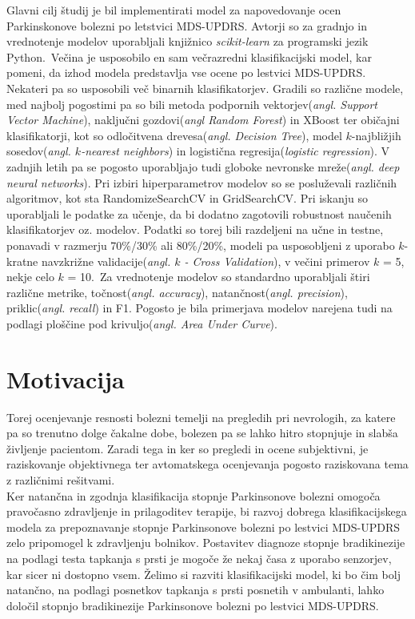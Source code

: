 \documentclass[a4paper,12pt]{article}  %
\begin{document}
Glavni cilj študij je bil implementirati model za napovedovanje ocen Parkinskonove bolezni po letstvici 
MDS-UPDRS. Avtorji so za gradnjo in vrednotenje modelov uporabljali knjižnico \textit{scikit-learn} za programski 
jezik Python.\
Večina je usposobilo en sam večrazredni klasifikacijski model, kar pomeni, da izhod modela predstavlja vse 
ocene po lestvici MDS-UPDRS. Nekateri pa so usposobili več binarnih klasifikatorjev. Gradili so različne 
modele, med najbolj pogostimi pa so bili metoda podpornih vektorjev(\textit{angl. Support Vector Machine}), naključni 
gozdovi(\textit{angl Random Forest}) in XBoost ter običajni klasifikatorji, kot so odločitvena drevesa(\textit{angl. Decision 
Tree}), model $k$-najbližjih sosedov(\textit{angl. $k$-nearest neighbors}) in logistična regresija(\textit{logistic 
regression}). V zadnjih letih pa se pogosto uporabljajo tudi globoke nevronske mreže(\textit{angl. deep neural 
networks}). Pri izbiri hiperparametrov modelov so se posluževali različnih algoritmov, kot sta 
RandomizeSearchCV in GridSearchCV. Pri iskanju so uporabljali le podatke za učenje, da bi dodatno 
zagotovili robustnost naučenih klasifikatorjev oz. modelov. Podatki so torej bili razdeljeni na učne in 
testne, ponavadi v razmerju 70\%/30\% ali 80\%/20\%, modeli pa usposobljeni z uporabo $k$-kratne navzkrižne 
validacije(\textit{angl. $k$ - Cross Validation}), v večini primerov $k$ = 5, nekje celo $k$ = 10.\
Za vrednotenje modelov so standardno uporabljali štiri različne metrike, točnost(\textit{angl. accuracy}), 
natančnost(\textit{angl. precision}), priklic(\textit{angl. recall}) in F1. Pogosto je bila primerjava modelov narejena 
tudi na podlagi ploščine pod krivuljo(\textit{angl. Area Under Curve}). 

\section{Motivacija}

Torej ocenjevanje resnosti bolezni temelji na pregledih pri nevrologih, za katere pa so trenutno dolge 
čakalne dobe, bolezen pa se lahko hitro stopnjuje in slabša življenje pacientom. Zaradi tega in ker so 
pregledi in ocene subjektivni, je raziskovanje objektivnega ter avtomatskega ocenjevanja pogosto 
raziskovana tema z različnimi rešitvami. \\

Ker natančna in zgodnja klasifikacija stopnje Parkinsonove bolezni omogoča pravočasno zdravljenje in 
prilagoditev terapije, bi razvoj dobrega klasifikacijskega modela za prepoznavanje stopnje Parkinsonove 
bolezni po lestvici MDS-UPDRS zelo pripomogel k zdravljenju bolnikov. Postavitev diagnoze stopnje 
bradikinezije na podlagi testa tapkanja s prsti je mogoče že nekaj časa z uporabo senzorjev, kar sicer ni 
dostopno vsem. Želimo si razviti klasifikacijski model, ki bo čim bolj natančno, na podlagi posnetkov tapkanja 
s prsti posnetih v ambulanti, lahko določil stopnjo bradikinezije Parkinsonove bolezni po lestvici MDS-UPDRS.
\end{document}

